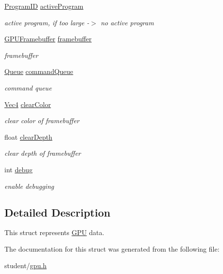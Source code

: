 \begin{DoxyCompactItemize}
\mbox{\label{structGPU_a175f0e62bab2c45d9ae535c5731fc263}} 
\hyperlink{student_2fwd_8h_a15e62786033208aec9487a51e808f81d}{Program\+ID} \hyperlink{structGPU_a175f0e62bab2c45d9ae535c5731fc263}{active\+Program}
\begin{DoxyCompactList}\small\item\em active program, if too large -\/$>$ no active program \end{DoxyCompactList}\item 
\mbox{\label{structGPU_ab05ff3e0a1b03486ebb89b834631a187}} 
\hyperlink{structGPUFramebuffer}{G\+P\+U\+Framebuffer} \hyperlink{structGPU_ab05ff3e0a1b03486ebb89b834631a187}{framebuffer}
\begin{DoxyCompactList}\small\item\em framebuffer \end{DoxyCompactList}\item 
\mbox{\label{structGPU_a87774e200e97ede957982fa4aa22ada6}} 
\hyperlink{structQueue}{Queue} \hyperlink{structGPU_a87774e200e97ede957982fa4aa22ada6}{command\+Queue}
\begin{DoxyCompactList}\small\item\em command queue \end{DoxyCompactList}\item 
\mbox{\label{structGPU_af7acb677fa94d1584c8b87af141ee584}} 
\hyperlink{structVec4}{Vec4} \hyperlink{structGPU_af7acb677fa94d1584c8b87af141ee584}{clear\+Color}
\begin{DoxyCompactList}\small\item\em clear color of framebuffer \end{DoxyCompactList}\item 
\mbox{\label{structGPU_a7136e6c78dbae48e165ca1d431810fba}} 
float \hyperlink{structGPU_a7136e6c78dbae48e165ca1d431810fba}{clear\+Depth}
\begin{DoxyCompactList}\small\item\em clear depth of framebuffer \end{DoxyCompactList}\item 
\mbox{\label{structGPU_ac5236c9dbb53bcb61119b40bea64f090}} 
int \hyperlink{structGPU_ac5236c9dbb53bcb61119b40bea64f090}{debug}
\begin{DoxyCompactList}\small\item\em enable debugging \end{DoxyCompactList}\end{DoxyCompactItemize}


\subsection{Detailed Description}
This struct represents \hyperlink{structGPU}{G\+PU} data. 

The documentation for this struct was generated from the following file\+:\begin{DoxyCompactItemize}
\item 
student/\hyperlink{gpu_8h}{gpu.\+h}\end{DoxyCompactItemize}
